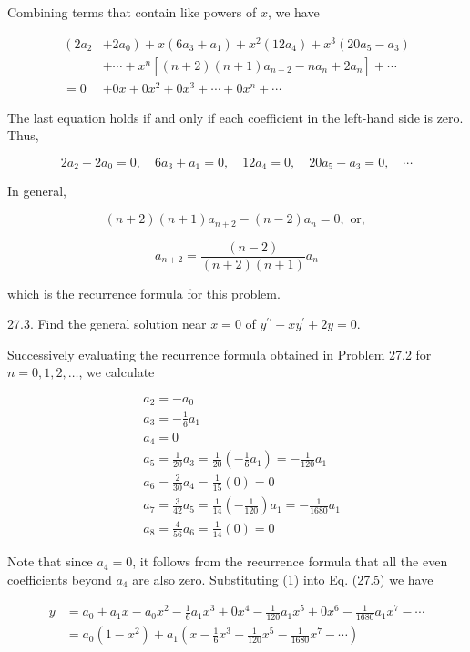 \documentclass[10pt]{article}
\begin{document}
Combining terms that contain like powers of $x$, we have

$$
\begin{aligned}
\left(2 a_{2}\right. & \left.+2 a_{0}\right)+x\left(6 a_{3}+a_{1}\right)+x^{2}\left(12 a_{4}\right)+x^{3}\left(20 a_{5}-a_{3}\right) \\
& +\cdots+x^{n}\left[(n+2)(n+1) a_{n+2}-n a_{n}+2 a_{n}\right]+\cdots \\
=0 & +0 x+0 x^{2}+0 x^{3}+\cdots+0 x^{n}+\cdots
\end{aligned}
$$

The last equation holds if and only if each coefficient in the left-hand side is zero. Thus,

$$
2 a_{2}+2 a_{0}=0, \quad 6 a_{3}+a_{1}=0, \quad 12 a_{4}=0, \quad 20 a_{5}-a_{3}=0, \quad \cdots
$$

In general,

$$
(n+2)(n+1) a_{n+2}-(n-2) a_{n}=0, \text { or, }
$$

$$
a_{n+2}=\frac{(n-2)}{(n+2)(n+1)} a_{n}
$$

which is the recurrence formula for this problem.

27.3. Find the general solution near $x=0$ of $y^{\prime \prime}-x y^{\prime}+2 y=0$.

Successively evaluating the recurrence formula obtained in Problem 27.2 for $n=0,1,2, \ldots$, we calculate


\begin{align*}
& a_{2}=-a_{0} \\
& a_{3}=-\frac{1}{6} a_{1} \\
& a_{4}=0 \\
& a_{5}=\frac{1}{20} a_{3}=\frac{1}{20}\left(-\frac{1}{6} a_{1}\right)=-\frac{1}{120} a_{1} \\
& a_{6}=\frac{2}{30} a_{4}=\frac{1}{15}(0)=0  \tag{1}\\
& a_{7}=\frac{3}{42} a_{5}=\frac{1}{14}\left(-\frac{1}{120}\right) a_{1}=-\frac{1}{1680} a_{1} \\
& a_{8}=\frac{4}{56} a_{6}=\frac{1}{14}(0)=0
\end{align*}


Note that since $a_{4}=0$, it follows from the recurrence formula that all the even coefficients beyond $a_{4}$ are also zero. Substituting (1) into Eq. (27.5) we have


\begin{align*}
y & =a_{0}+a_{1} x-a_{0} x^{2}-\frac{1}{6} a_{1} x^{3}+0 x^{4}-\frac{1}{120} a_{1} x^{5}+0 x^{6}-\frac{1}{1680} a_{1} x^{7}-\cdots  \tag{2}\\
& =a_{0}\left(1-x^{2}\right)+a_{1}\left(x-\frac{1}{6} x^{3}-\frac{1}{120} x^{5}-\frac{1}{1680} x^{7}-\cdots\right)
\end{align*}
\end{document}
